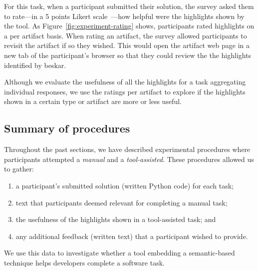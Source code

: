 For this task, when a participant submitted their solution, the survey asked them to 
rate---in a 5 points Likert scale~\cite{likert1932technique}---how helpful were the highlights shown by the tool.
As Figure~\ref{fig:experiment-rating} shows, participants rated highlights on a per artifact basis. When rating an artifact, the survey allowed participants to revisit the artifact if so they wished. This would open the artifact web page in a new tab of the participant's browser so that they
could review the the highlights identified by \acs{beskar}.

Although we evaluate the usefulness of all the highlights for a task
aggregating individual responses, we use the ratings per artifact to explore if the highlights shown in a certain type or artifact are more or less useful.





\subsection{Summary of procedures}


Throughout the past sections, we have described experimental procedures 
where participants attempted a \textit{manual} and a \textit{tool-assisted}.
These procedures allowed us to gather:


\begin{enumerate}
\item a participant's submitted solution (written Python code) for each task;
\item text that participants deemed relevant for completing a manual task;
\item the usefulness of the highlights shown in a tool-assisted task; and
\item any additional feedback (written text) that a participant wished to provide.
\end{enumerate}


We use this data to investigate whether 
a tool embedding a semantic-based technique helps developers complete a software task. 


\clearpage


